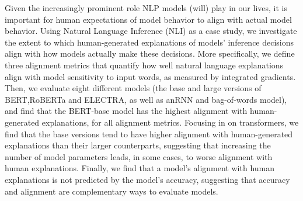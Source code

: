 Given the increasingly prominent role NLP models (will) play in our lives, it is important for human expectations of model behavior to align with actual model behavior. Using Natural Language Inference (NLI) as a case study, we investigate the extent to which human-generated explanations of models' inference decisions align with how models actually make these decisions. More specifically, we define three alignment metrics that quantify how well natural language explanations align with model sensitivity to input words, as measured by integrated gradients. Then, we evaluate eight different models (the base and large versions of BERT,RoBERTa and ELECTRA, as well as anRNN and bag-of-words model), and find that the BERT-base model has the highest alignment with human-generated explanations, for all alignment metrics. Focusing in on transformers, we find that the base versions tend to have higher alignment with human-generated explanations than their larger counterparts, suggesting that increasing the number of model parameters leads, in some cases, to worse alignment with human explanations. Finally, we find that a model's alignment with human explanations is not predicted by the model's accuracy, suggesting that accuracy and alignment are complementary ways to evaluate models.
